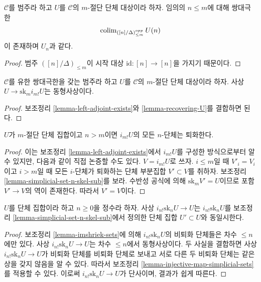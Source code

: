 \begin{lemma}
\label{lemma-recovering-U}
$\mathcal{C}$를 범주라 하고 $U$를 $\mathcal{C}$의 $m$-절단 단체 대상이라
하자. 임의의 $n \leq m$에 대해 쌍대극한
$$
\mathop{\mathrm{colim}}\nolimits_{([n]/\Delta)_{\leq m}^{opp}} U(n)
$$
이 존재하며 $U_n$과 같다.
\end{lemma}

\begin{proof}
범주 $([n]/\Delta)_{\leq m}$이 시작 대상
$\text{id} : [n] \to [n]$을 가지기 때문이다.
\end{proof}

\begin{lemma}
\label{lemma-recovering-U-for-real}
$\mathcal{C}$를 유한 쌍대극한을 갖는 범주라 하고 $U$를
$\mathcal{C}$의 $m$-절단 단체 대상이라 하자. 사상
$U \to \text{sk}_m i_{m!}U$는 동형사상이다.
\end{lemma}

\begin{proof}
보조정리 \ref{lemma-left-adjoint-exists}와 \ref{lemma-recovering-U}를
결합하면 된다.
\end{proof}

\begin{lemma}
\label{lemma-imshriek-sets}
$U$가 $m$-절단 단체 집합이고 $n > m$이면 $i_{m!}U$의 모든
$n$-단체는 퇴화한다.
\end{lemma}

\begin{proof}
이는 보조정리 \ref{lemma-left-adjoint-exists}에서 $i_{m!}U$를 구성한
방식으로부터 알 수 있지만, 다음과 같이 직접 논증할 수도 있다.
$V = i_{m!}U$로 쓰자. $i \leq m$일 때 $V'_i = V_i$이고
$i > m$일 때 모든 $i$-단체가 퇴화하는 단체 부분집합
$V' \subset V$를 취하자. 보조정리
\ref{lemma-simplicial-set-n-skel-sub}를 보라. 수반성 공식에 의해
$\text{sk}_m V' = U$이므로 포함 $V' \to V$의 역이 존재한다.
따라서 $V' = V$이다.
\end{proof}

\begin{lemma}
\label{lemma-n-skeleton-sets}
$U$를 단체 집합이라 하고 $n \geq 0$을 정수라 하자. 사상
$i_{n!} \text{sk}_n U \to U$는 $i_{n!} \text{sk}_n U$를 보조정리
\ref{lemma-simplicial-set-n-skel-sub}에서 정의한 단체 집합
$U' \subset U$와 동일시한다.
\end{lemma}

\begin{proof}
보조정리 \ref{lemma-imshriek-sets}에 의해
$i_{n!} \text{sk}_n U$의 비퇴화 단체들은 차수 $\leq n$에만 있다.
사상 $i_{n!} \text{sk}_n U \to U$는 차수 $\leq n$에서 동형사상이다.
두 사실을 결합하면 사상 $i_{n!} \text{sk}_n U \to U$가 비퇴화 단체를
비퇴화 단체로 보내고 서로 다른 두 비퇴화 단체는 같은 상을 갖지 않음을
알 수 있다. 따라서 보조정리 \ref{lemma-injective-map-simplicial-sets}를
적용할 수 있다. 이로써 $i_{n!} \text{sk}_n U \to U$가 단사이며,
결과가 쉽게 따른다.
\end{proof}

